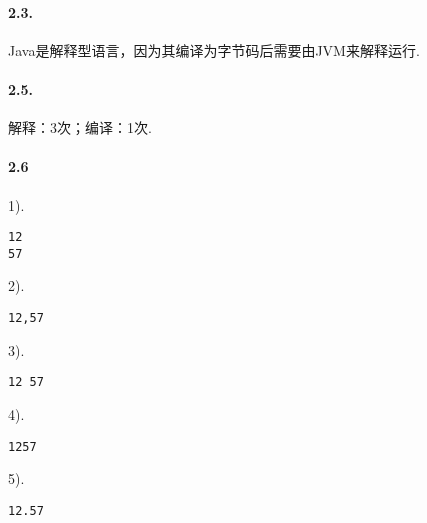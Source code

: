 \documentclass[UTF8]{ctexart}
\begin{document}
\pagestyle{main}

\paragraph{2.3.}
Java是解释型语言，因为其编译为字节码后需要由JVM来解释运行.

\paragraph{2.5.}
解释：3次；编译：1次.

\paragraph{2.6\\}
1).\begin{lstlisting}[showspaces=true, showlines=true]
12
57

\end{lstlisting}
2).\begin{lstlisting}[showspaces=true, showlines=true]
12,57

\end{lstlisting}
3).\begin{lstlisting}[showspaces=true, showlines=true]
12 57

\end{lstlisting}
4).\begin{lstlisting}[showspaces=true, showlines=true]
1257

\end{lstlisting}
5).\begin{lstlisting}[showspaces=true, showlines=true]
12.57

\end{lstlisting}
\end{document}
